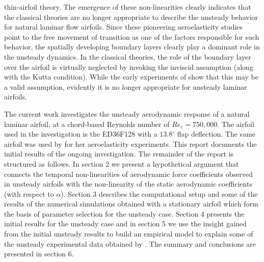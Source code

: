 thin-airfoil theory. The emergence of these non-linearities clearly indicates that the classical theories are no longer appropriate to describe the unsteady behavior for natural laminar flow airfoils. Since these pioneering aeroelasticity studies point to the free movement of transition as one of the factors responsible for such behavior, the spatially developing boundary layers clearly play a dominant role in the unsteady dynamics. In the classical theories, the role of the boundary layer over the airfoil is virtually neglected by invoking the inviscid assumption (along with the Kutta condition). While the early experiments of \cite{halfman52} show that this may be a valid assumption, evidently it is no longer appropriate for unsteady laminar airfoils.

The current work investigates the unsteady aerodynamic response of a natural laminar airfoil, at a chord-based Reynolds number of $Re_{c}=750,000$. The airfoil used in the investigation is the ED36F128 \citep{lokatt17,lokattthesis} with a $13.8^{\circ}$ flap deflection. The same airfoil was used by \cite{lokattthesis} for her aeroelasticity experiments. This report documents the initial results of the ongoing investigation. The remainder of the report is structured as follows. In section 2 we present a hypothetical argument that connects the temporal non-linearities of aerodynamic force coefficients observed in unsteady airfoils with the non-linearity of the static aerodynamic coefficients (with respect to $\alpha$). Section 3 describes the computational setup and some of the results of the numerical simulations obtained with a stationary airfoil which form the basis of parameter selection for the unsteady case. Section 4 presents the initial results for the unsteady case and in section 5 we use the insight gained from the initial unsteady results to build an empirical model to explain some of the unsteady experimental data obtained by \cite{lokattthesis}. The summary and conclusions are presented in section 6.

